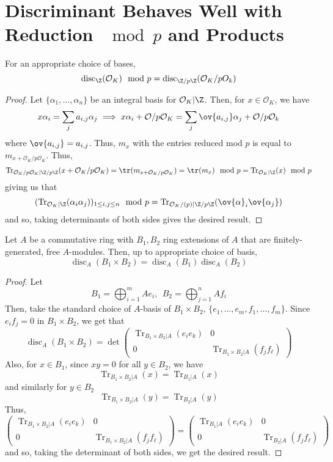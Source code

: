\documentclass[11pt,leqno,oneside]{amsart}
\numberwithin{thm}{section}
\renewcommand{\O}{\mathcal{O}}
\newcommand{\disc}{\operatorname{disc}}
\newcommand{\Tr}{\operatorname{Tr}}
\begin{document}
\section{Discriminant Behaves  Well with Reduction \(\mod p\) and Products}
\begin{lem}\label{disc-plays-nice-with-mod-p}
  For an appropriate choice of bases, \[
    \disc_\Z(\O_K) \mod p = \disc_{\Z/p\Z}(\O_K/pO_k)
  \]
\end{lem}
\begin{proof}
  Let \(\{\alpha_1, \ldots, \alpha_n\}\) be an integral basis for
  \(\O_K|\Z\). Then, for \(x \in \O_K\), we have \[
    x \alpha_i = \sum_j a_{i,j} \alpha_j \implies x \alpha_i +
    \O/p\O_K = \sum_j \ov{a_{i,j}} \alpha_j + \O/p\O_k
  \]
  where \(\ov{a_{i,j}} = a_{i,j}\). Thus, \(m_x\) with the entries
  reduced mod \(p\) is equal to \(m_{x+\O_K/p\O_K}\). Thus, \[
    \Tr_{\O_K/p\O_K | \Z/p\Z}(x+\O_K/p\O_K) = \tr(m_{x+\O_K/p\O_K}) =
    \tr(m_x) \mod p = \Tr_{\O_K|\Z}(x) \mod p
  \]
  giving us that \[
    (\Tr_{\O_K|\Z}(\alpha_i \alpha_j))_{1 \leq i,j \leq n} \mod p =
    \Tr_{\O_K/(p)|\Z/p\Z}(\ov{\alpha}_i \ov{\alpha_j})
  \]
  and so, taking determinants of both sides gives the desired result.
\end{proof}
\begin{lem}\label{disc-plays-nice-with-prod}
  Let \(A\) be a commutative ring with \(B_1, B_2\) ring
  extensions of \(A\) that are finitely-generated, free
  \(A\)-modules. Then, up to appropriate choice of basis, \[
    \disc_A(B_1 \times B_2) = \disc_A(B_1) \disc_A(B_2)
  \]
\end{lem}
\begin{proof}
  Let \[
    B_1 = \bigoplus_{i=1}^m A e_i, \ \ B_2 = \bigoplus_{j=1}^n A f_i
  \]
  Then, take the standard choice of \(A\)-basis of \(B_1 \times B_2\),
  \(\{e_1, \ldots, e_m, f_1, \ldots, f_m\}\). Since \(e_i f_j = 0\) in
  \(B_1 \times B_2\), we get that \[
    \disc_A(B_1 \times B_2) = \det \left(
      \begin{array}{cc}
        \Tr_{B_1 \times B_2 | A}(e_i e_k)& 0 \\
        0 & \Tr_{B_1 \times B_2 | A}(f_j f_\ell)
      \end{array}
    \right)
  \]
  Also, for \(x \in B_1\), since \(xy = 0\) for all \(y \in B_2\), we
  have \[
    \Tr_{B_1 \times B_2|A}(x) = \Tr_{B_1|A}(x)
  \]
  and similarly for \(y \in B_2\) \[
    \Tr_{B_1 \times B_2|A}(y) = \Tr_{B_2|A}(y)
  \]
  Thus, \[
\left(
      \begin{array}{cc}
        \Tr_{B_1 \times B_2 | A}(e_i e_k)& 0 \\
        0 & \Tr_{B_1 \times B_2 | A}(f_j f_\ell)
      \end{array}
    \right) = \left(
      \begin{array}{cc}
        \Tr_{B_1 | A}(e_i e_k)& 0 \\
        0 & \Tr_{B_2 | A}(f_j f_\ell)
      \end{array}
    \right)
  \]
  and so, taking the determinant of both sides, we get the desired result.
\end{proof}
\end{document}

